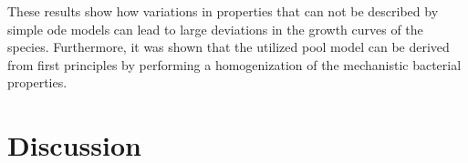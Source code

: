 \documentclass[10pt,A4paper]{article}
\numberwithin{equation}{section}
\begin{document}
These results show how variations in properties that can not be described by simple \ac{ode} models can lead to large deviations in the growth curves of the species.
Furthermore, it was shown that the utilized pool model can be derived from first principles by performing a homogenization of the mechanistic bacterial properties.
%
%
\section{Discussion}

%
%
%
\end{document}

